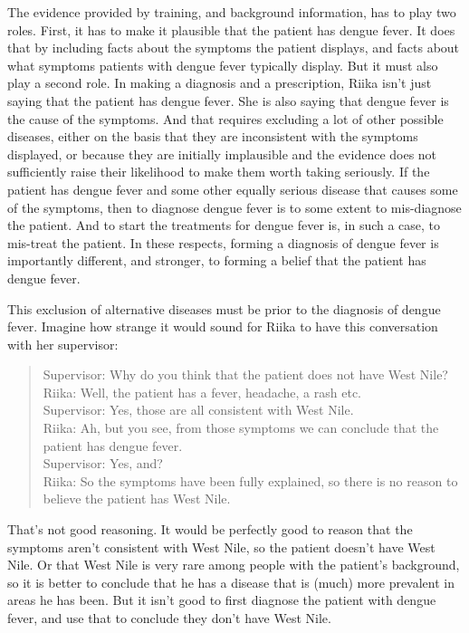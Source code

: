 The evidence provided by training, and background information, has to play two roles. First, it has to make it plausible that the patient has dengue fever. It does that by including facts about the symptoms the patient displays, and facts about what symptoms patients with dengue fever typically display. But it must also play a second role. In making a diagnosis and a prescription, \gls{Riika} isn't just saying that the patient has dengue fever. She is also saying that dengue fever is the cause of the symptoms. And that requires excluding a lot of other possible diseases, either on the basis that they are inconsistent with the symptoms displayed, or because they are initially implausible and the evidence does not sufficiently raise their likelihood to make them worth taking seriously. If the patient has dengue fever and some other equally serious disease that causes some of the symptoms, then to diagnose dengue fever is to some extent to mis-diagnose the patient. And to start the treatments for dengue fever is, in such a case, to mis-treat the patient. In these respects, forming a diagnosis of dengue fever is importantly different, and stronger, to forming a belief that the patient has dengue fever.

This exclusion of alternative diseases must be prior to the diagnosis of dengue fever. Imagine how strange it would sound for \gls{Riika} to have this conversation with her supervisor:

\begin{quote}
Supervisor: Why do you think that the patient does not have West Nile?\\
\gls{Riika}: Well, the patient has a fever, headache, a rash etc.\\
Supervisor: Yes, those are all consistent with West Nile.\\
\gls{Riika}: Ah, but you see, from those symptoms we can conclude that the patient has dengue fever.\\
Supervisor: Yes, and?\\
\gls{Riika}: So the symptoms have been fully explained, so there is no reason to believe the patient has West Nile.
\end{quote}
That's not good reasoning. It would be perfectly good to reason that the symptoms aren't consistent with West Nile, so the patient doesn't have West Nile. Or that West Nile is very rare among people with the patient's background, so it is better to conclude that he has a disease that is (much) more prevalent in areas he has been. But it isn't good to first diagnose the patient with dengue fever, and use that to conclude they don't have West Nile.

